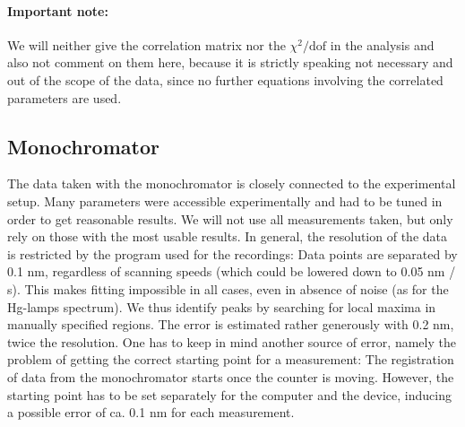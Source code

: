 \paragraph{\textbf{Important note:}}
\label{par:important note}
We will neither give the correlation matrix nor the $\chi^2/\mathrm{dof}$ in the analysis and also
not comment on them here, because it is strictly speaking not necessary and out of the scope of the data,
since no further equations involving the correlated parameters are used. 



\clearpage


\subsection{Monochromator}
The data taken with the monochromator is closely connected to the experimental setup. Many parameters were accessible 
experimentally and had to be tuned in order to get reasonable results. We will not use all measurements taken, but only 
rely on those with the most usable results. In general, the resolution of the data is restricted by the program used for 
the recordings: Data points are separated by 0.1 nm, regardless of scanning speeds (which could be lowered down to 0.05 
nm / s). This makes fitting impossible in all cases, even in absence of noise (as for the Hg-lamps spectrum). We thus 
identify peaks by searching for local maxima in manually specified regions. The error is estimated rather generously with 
0.2 nm, twice the resolution. One has to keep in mind another source of error, namely the problem of getting the correct 
starting point for a measurement: The registration of data from the monochromator starts once the counter is moving.
However, the starting point has to be set separately for the computer and the device, inducing a possible error of ca. 
0.1 nm for each measurement. 

